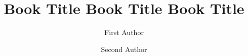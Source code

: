 
\begin{frontpage}

\title{Book Title Book Title Book Title}

\maketitle


\author{First Author}
\address{,
,
}


\author{Second Author}
\address{,
,
}
\end{frontpage}





\begin{frontchapter}
\begin{frontmatter}
\chapter*{\contentsname}
\makechaptertitle
\end{frontmatter}


\tableofcontents

\end{frontchapter}




